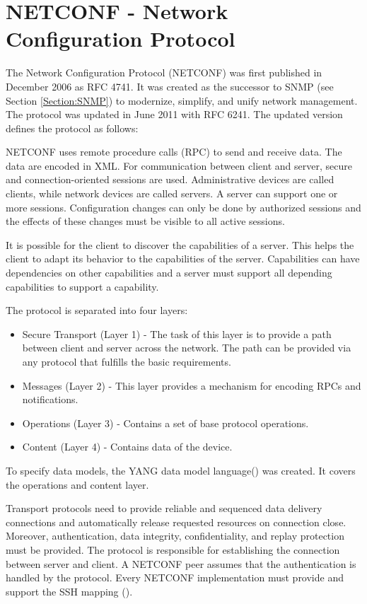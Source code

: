 \newpage
\section{NETCONF - Network Configuration Protocol}
\label{Section:NETCONF}

The Network Configuration Protocol (NETCONF) was first published in December 2006 as RFC 4741\cite{RFC:RFC4741:2006}. It was created as the successor to SNMP (see Section \ref{Section:SNMP}) to modernize, simplify, and unify network management.  The protocol was updated in June 2011 with RFC 6241\cite{RFC:RFC6241:2011}. The updated version defines the protocol as follows:

NETCONF uses remote procedure calls (RPC) to send and receive data. The data are encoded in XML. For communication between client and server, secure and connection-oriented sessions are used. Administrative devices are called clients, while network devices are called servers. A server can support one or more sessions. Configuration changes can only be done by authorized sessions and the effects of these changes must be visible to all active sessions.

It is possible for the client to discover the capabilities of a server. This helps the client to adapt its behavior to the capabilities of the server. Capabilities can have dependencies on other capabilities and a server must support all depending capabilities to support a capability.

The protocol is separated into four layers:

\begin{minipage}{\textwidth}
\begin{itemize}
    \item Secure Transport (Layer 1) -  The task of this layer is to provide a path between client and server across the network. The path can be provided via any protocol that fulfills the basic requirements.
    \item Messages (Layer 2) - This layer provides a mechanism for encoding RPCs and notifications.
    \item Operations (Layer 3) - Contains a set of base protocol operations.
    \item Content (Layer 4) - Contains data of the device.
\end{itemize}
\end{minipage}

To specify data models, the YANG data model language(\cite{RFC:RFC6020:2010}) was created. It covers the operations and content layer.

Transport protocols need to provide reliable and sequenced data delivery connections and automatically release requested resources on connection close. Moreover, authentication, data integrity, confidentiality, and replay protection must be provided. The protocol is responsible for establishing the connection between server and client. A NETCONF peer assumes that the authentication is handled by the protocol. Every NETCONF implementation must provide and support the SSH mapping (\cite{RFC:RFC6242:2011}).